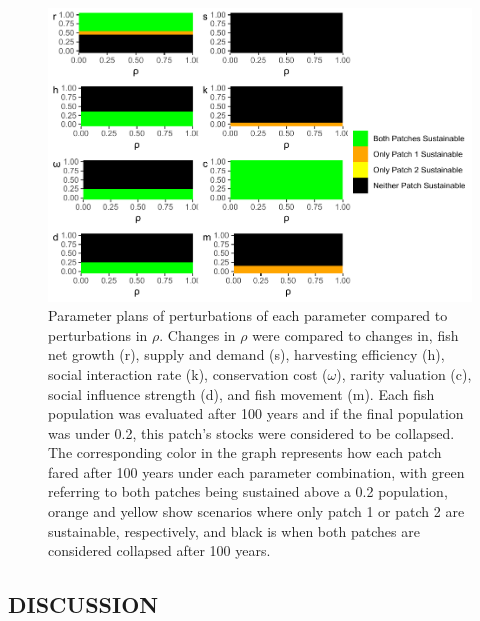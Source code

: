 \documentclass[
  12pt,
]{article}
\begin{document}
\begin{figure}
\centering
\includegraphics{Wulfing_Thesis_files/figure-latex/rhoParamPlane-1.pdf}
\caption{\label{fig:rhoParamPlane}Parameter plans of perturbations of each parameter compared to perturbations in \(\rho\). Changes in \(\rho\) were compared to changes in, fish net growth (r), supply and demand (s), harvesting efficiency (h), social interaction rate (k), conservation cost (\(\omega\)), rarity valuation (c), social influence strength (d), and fish movement (m). Each fish population was evaluated after 100 years and if the final population was under 0.2, this patch's stocks were considered to be collapsed. The corresponding color in the graph represents how each patch fared after 100 years under each parameter combination, with green referring to both patches being sustained above a 0.2 population, orange and yellow show scenarios where only patch 1 or patch 2 are sustainable, respectively, and black is when both patches are considered collapsed after 100 years. \label{rhoParamPlane}}
\end{figure}

\hypertarget{discussion-1}{%
\subsection{DISCUSSION}\label{discussion-1}}
\end{document}
